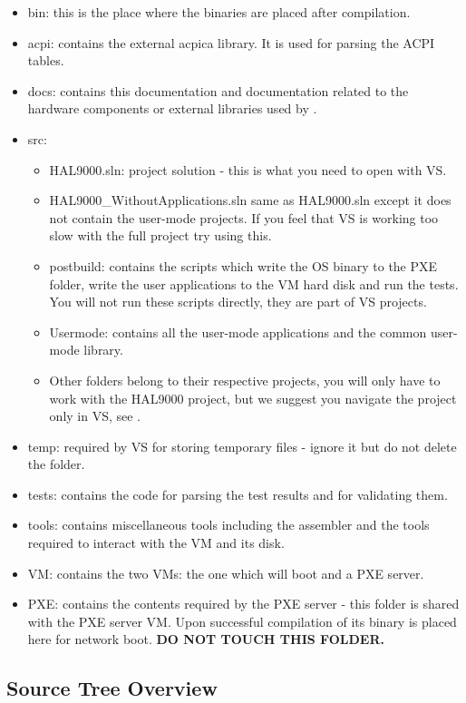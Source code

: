 \begin{itemize}
	\item bin: this is the place where the binaries are placed after compilation.
	\item acpi: contains the external acpica library. It is used for parsing the ACPI tables.
	\item docs: contains this documentation and documentation related to the hardware components or
external libraries used by \projectname.
	\item src:
		\begin{itemize}
			\item HAL9000.sln: project solution - this is what you need to open with VS.
			\item HAL9000\_WithoutApplications.sln same as HAL9000.sln except it does not contain
		the user-mode projects. If you feel that VS is working too slow with the full project try
		using this.
			\item postbuild: contains the scripts which write the OS binary to the PXE folder, write
		the user applications to the VM hard disk and run the tests. You will not run these scripts
		directly, they are part of VS projects.
			\item Usermode: contains all the user-mode applications and the common user-mode library.
			\item Other folders belong to their respective projects, you will only have to work with
		the HAL9000 project, but we suggest you navigate the project only in VS, see
		.
		\end{itemize}
	\item temp: required by VS for storing temporary files - ignore it but do not delete the folder.
	\item tests: contains the code for parsing the test results and for validating them.
	\item tools: contains miscellaneous tools including the assembler and the tools required to
	interact with the VM and its disk.
	\item VM: contains the two VMs: the one which will boot \projectname and a PXE server.
	\item PXE: contains the contents required by the PXE server - this folder is shared with the
	PXE server VM. Upon successful compilation of \projectname its binary is placed here for network
	boot. \textbf{DO NOT TOUCH THIS FOLDER.}
\end{itemize}

\subsection{Source Tree Overview}
\label{sect:SourceTree}

